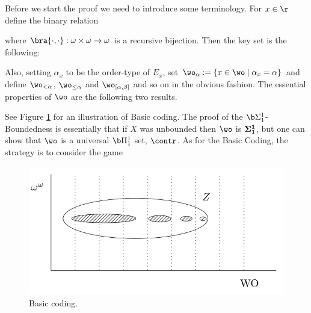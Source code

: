 Before we start the proof we need to introduce some terminology. For $x\in\r$ define the binary relation

where $\bra{\cdot,\cdot}:\omega\times\omega\to\omega$ is a recursive bijection. Then the key set is the following:

Also, setting $\alpha_x$ to be the order-type of $E_x$, set $\wo_\alpha:=\{x\in\wo\mid\alpha_x=\alpha\}$ and define $\wo_{<\alpha}$, $\wo_{\leq\alpha}$ and $\wo_{[\alpha,\beta]}$ and so on in the obvious fashion. The essential properties of $\wo$ are the following two results.



See Figure \ref{fig.coding1} for an illustration of Basic coding. The proof of the $\b\Sigma^1_1$-Boundedness is essentially that if $X$ was unbounded then $\wo$ is $\bf\Sigma^1_1$, but one can show that $\wo$ is a universal $\b\Pi^1_1$ set, $\contr$. As for the Basic Coding, the strategy is to consider the game

\begin{figure}
	\label{fig.coding1}
	\begin{center}
		\includegraphics[scale=0.6]{coding1.png}
		\caption{Basic coding.}
	\end{center}
\end{figure}

